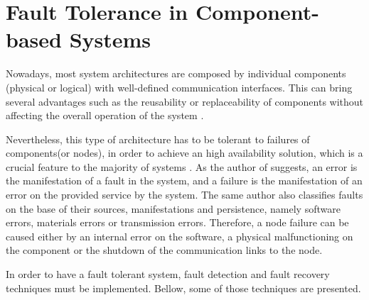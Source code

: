 \section{Fault Tolerance in Component-based Systems}

Nowadays, most system architectures are composed by individual components (physical or logical) with well-defined communication interfaces. This can bring several advantages such as the reusability or replaceability of components without affecting the overall operation of the system \cite{TutorialsPoint}.

Nevertheless, this type of architecture has to be tolerant to failures of components(or nodes), in order to achieve an high availability solution, which is a crucial feature to the majority of systems \cite{Sun2014a}. As the author of \cite{Zaiter2013} suggests, an error is the manifestation of a fault in the system, and a failure is the manifestation of an error on the provided service by the system. The same author also classifies faults on the base of their sources, manifestations and persistence, namely software errors, materials errors or transmission errors. Therefore, a node failure can be caused either by an internal error on the software, a physical malfunctioning on the component or the shutdown of the communication links to the node.

In order to have a fault tolerant system, fault detection and fault recovery techniques must be implemented. Bellow, some of those techniques are presented.

